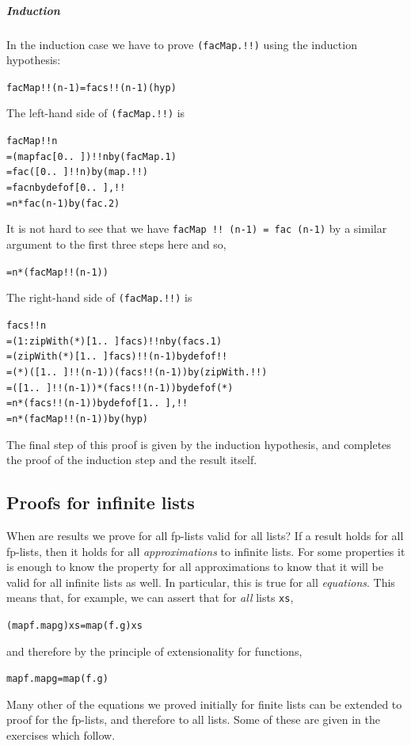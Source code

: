 \subparagraph*{Induction}
In the induction case we have to prove \texttt{(facMap.!!)}
using the induction hypothesis:
\begin{alltt}
facMap!!(n-1) = facs!!(n-1) \hfill (hyp)
\end{alltt}
The left-hand side of \texttt{(facMap.!!)} is
\begin{alltt}
facMap!!n
  = (map fac [0 ..\ ])!!n \hfill {\rm by} (facMap.1)
  = fac ([0 ..\ ]!!n) \hfill {\rm by} (map.!!)
  = fac n \hfill {\rm by def of} [0 ..\ ],!!
  = n * fac (n-1) \hfill {\rm by} (fac.2)
\end{alltt}
It is not hard to see that we have 
\texttt{facMap !!\ (n-1) = fac (n-1)} by a similar argument to the first three steps here
and so,
\begin{alltt}
  = n * (facMap!!(n-1))
\end{alltt}
The right-hand side of \texttt{(facMap.!!)} is 
\begin{alltt}
facs!!n
  = (1 : zipWith (*) [1 ..\ ] facs)!!n \hfill{\rm by} (facs.1)
  = (zipWith (*) [1 ..\ ] facs)!!(n-1) \hfill {\rm by def of} !!
  = (*) ([1 ..\ ]!!(n-1)) (facs!!(n-1))\hfill {\rm by} (zipWith.!!)
  = ([1 ..\ ]!!(n-1)) * (facs!!(n-1))\hfill {\rm by def of} (*)
  = n * (facs!!(n-1)) \hfill {\rm by def of} [1 ..\ ],!!
  = n * (facMap!!(n-1)) \hfill {\rm by} (hyp)
\end{alltt}
The final step of this proof is given by the induction hypothesis, and
completes the proof of the induction step and the result itself. \blackbox

\subsection*{Proofs for infinite lists}

When are results we prove for all fp-lists valid for all lists? If a
result holds for all fp-lists, then it holds for all {\em approximations\/}
to infinite lists. For some properties it is enough to know the property
for all approximations to know that it will be valid for all infinite lists
as well. In particular, this is true for all {\em equations\/}. This means
that, for example, we can assert that for {\em all\/} lists \texttt{xs},
\begin{alltt}
(map f . map g) xs = map (f.g) xs
\end{alltt}
and therefore by the principle of extensionality for functions,
\begin{alltt}
map f . map g = map (f.g)
\end{alltt}
Many other of the equations we proved initially for finite lists can be
extended to proof for the fp-lists, and therefore to all lists. Some
of these are given in the exercises which follow.

